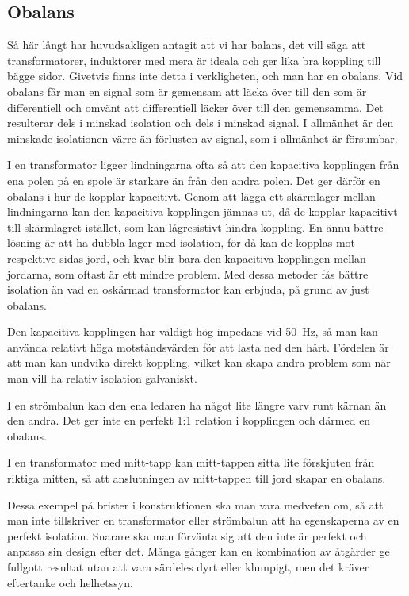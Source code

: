 \subsection{Obalans}

Så här långt har huvudsakligen antagit att vi har balans, det vill säga att
transformatorer, induktorer med mera är ideala och ger lika bra koppling till
bägge sidor.
Givetvis finns inte detta i verkligheten, och man har en obalans.
Vid obalans får man en signal som är gemensam att läcka över till den som är
differentiell och omvänt att differentiell läcker över till den gemensamma.
Det resulterar dels i minskad isolation och dels i minskad signal.
I allmänhet är den minskade isolationen värre än förlusten av signal, som i
allmänhet är försumbar.

I en transformator ligger lindningarna ofta så att den kapacitiva kopplingen
från ena polen på en spole är starkare än från den andra polen.
Det ger därför en obalans i hur de kopplar kapacitivt.
Genom att lägga ett skärmlager mellan lindningarna kan den kapacitiva
kopplingen jämnas ut, då de kopplar kapacitivt till skärmlagret istället,
som kan lågresistivt hindra koppling.
En ännu bättre lösning är att ha dubbla lager med isolation, för då
kan de kopplas mot respektive sidas jord, och kvar blir bara den kapacitiva
kopplingen mellan jordarna, som oftast är ett mindre problem.
Med dessa metoder fås bättre isolation än vad en oskärmad transformator kan
erbjuda, på grund av just obalans.

Den kapacitiva kopplingen har väldigt hög impedans vid \qty{50}{\hertz}, så man
kan använda relativt höga motståndsvärden för att lasta ned den hårt.
Fördelen är att man kan undvika direkt koppling, vilket kan skapa andra
problem som när man vill ha relativ isolation galvaniskt.

I en strömbalun kan den ena ledaren ha något lite längre varv runt kärnan än
den andra.
Det ger inte en perfekt 1:1 relation i kopplingen och därmed en obalans.

I en transformator med mitt-tapp kan mitt-tappen sitta lite förskjuten från
riktiga mitten, så att anslutningen av mitt-tappen till jord skapar en
obalans.

Dessa exempel på brister i konstruktionen ska man vara medveten om, så att man
inte tillskriver en transformator eller strömbalun att ha egenskaperna av en
perfekt isolation.
Snarare ska man förvänta sig att den inte är perfekt och anpassa sin design
efter det.
Många gånger kan en kombination av åtgärder ge fullgott resultat utan att vara
särdeles dyrt eller klumpigt, men det kräver eftertanke och helhetssyn.

